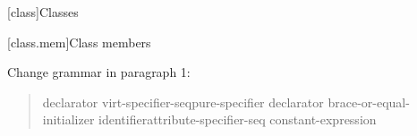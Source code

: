 
\setcounter{chapter}{11}
[class]{Classes}

\setcounter{section}{1}
[class.mem]{Class members}

Change grammar in paragraph 1:

\begin{quote}
\pnum
\begin{bnf}
\br
    declarator virt-specifier-seq\opt pure-specifier\opt\br
    \br
    declarator brace-or-equal-initializer\opt\br
    identifier\opt attribute-specifier-seq\opt \tcode{:} constant-expression
\end{bnf}
\end{quote}
